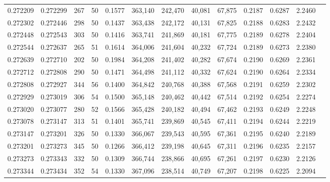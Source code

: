 \begin{tabular}{rrrrrrrrrrrrr}
0.272209 & 0.272299 &   267 &  50 &                                     0.1577 & 363,140 & 242,470 &  40,081 &  67,875 & 0.2187 & 0.6287 & 2.2460 \\
0.272302 & 0.272446 &   298 &  50 &                                     0.1437 & 363,438 & 242,172 &  40,131 &  67,825 & 0.2188 & 0.6283 & 2.2432 \\
0.272448 & 0.272543 &   303 &  50 &                                     0.1416 & 363,741 & 241,869 &  40,181 &  67,775 & 0.2189 & 0.6278 & 2.2404 \\
0.272544 & 0.272637 &   265 &  51 &                                     0.1614 & 364,006 & 241,604 &  40,232 &  67,724 & 0.2189 & 0.6273 & 2.2380 \\
0.272639 & 0.272710 &   202 &  50 &                                     0.1984 & 364,208 & 241,402 &  40,282 &  67,674 & 0.2190 & 0.6269 & 2.2361 \\
0.272712 & 0.272808 &   290 &  50 &                                     0.1471 & 364,498 & 241,112 &  40,332 &  67,624 & 0.2190 & 0.6264 & 2.2334 \\
0.272808 & 0.272927 &   344 &  56 &                                     0.1400 & 364,842 & 240,768 &  40,388 &  67,568 & 0.2191 & 0.6259 & 2.2302 \\
0.272929 & 0.273019 &   306 &  54 &                                     0.1500 & 365,148 & 240,462 &  40,442 &  67,514 & 0.2192 & 0.6254 & 2.2274 \\
0.273020 & 0.273077 &   280 &  52 &                                     0.1566 & 365,428 & 240,182 &  40,494 &  67,462 & 0.2193 & 0.6249 & 2.2248 \\
0.273078 & 0.273147 &   313 &  51 &                                     0.1401 & 365,741 & 239,869 &  40,545 &  67,411 & 0.2194 & 0.6244 & 2.2219 \\
0.273147 & 0.273201 &   326 &  50 &                                     0.1330 & 366,067 & 239,543 &  40,595 &  67,361 & 0.2195 & 0.6240 & 2.2189 \\
0.273201 & 0.273273 &   345 &  50 &                                     0.1266 & 366,412 & 239,198 &  40,645 &  67,311 & 0.2196 & 0.6235 & 2.2157 \\
0.273273 & 0.273343 &   332 &  50 &                                     0.1309 & 366,744 & 238,866 &  40,695 &  67,261 & 0.2197 & 0.6230 & 2.2126 \\
0.273344 & 0.273434 &   352 &  54 &                                     0.1330 & 367,096 & 238,514 &  40,749 &  67,207 & 0.2198 & 0.6225 & 2.2094 \\

\end{tabular}
